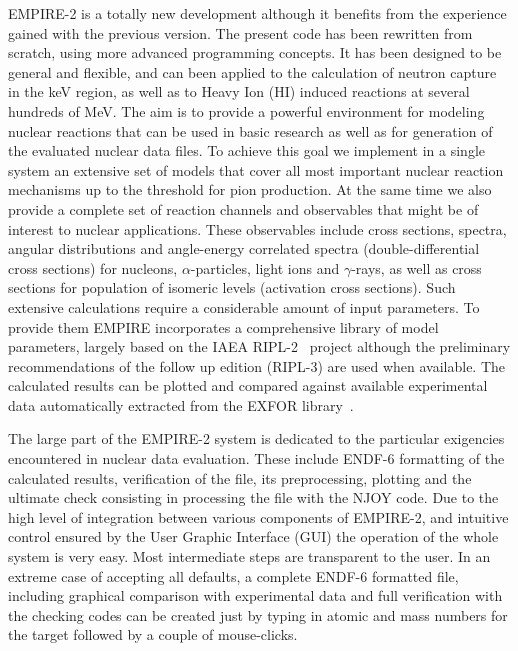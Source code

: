 \documentclass[twocolumn,amsmath,amssymb,10pt,groupedaddress,a4paper]{revtex4}
\begin{document}
EMPIRE-2 is a totally new development although it benefits from the experience
gained with the previous version. The present code
has been rewritten from scratch, using more advanced programming concepts.
It has been designed to be general and flexible, and can been applied
to the calculation of neutron capture in the keV region, as well as
to Heavy Ion (HI) induced reactions at several hundreds of MeV. The aim is to
provide a powerful environment for modeling nuclear reactions that can be used
in basic research as well as for generation of the evaluated nuclear data files.
To achieve this goal we implement in a single system an extensive set of
models that cover all most important nuclear reaction mechanisms up to the
threshold for pion production. At the same time we also provide a complete set of reaction channels and
observables that might be of interest to nuclear applications. These observables include
cross sections, spectra, angular distributions and angle-energy correlated spectra
(double-differential cross sections) for nucleons, $\alpha$-particles, light ions
and $\gamma$-rays, as well as cross sections for population of isomeric levels
(activation cross sections). Such extensive calculations require a considerable amount
of input parameters. To provide them EMPIRE incorporates a comprehensive library of model
parameters, largely based on the IAEA RIPL-2~\cite{RIPL-2} project
although the preliminary recommendations of the follow up edition (RIPL-3) are used when available. The calculated results
can be plotted and compared against available experimental data automatically extracted
from the EXFOR library~\cite{EXFOR}.

The large part of the EMPIRE-2 system is dedicated to the
particular exigencies encountered in nuclear data evaluation. These include ENDF-6 formatting
of the calculated results, verification of the file, its preprocessing, plotting and the ultimate check consisting in processing the file with the NJOY code. Due to the high level of
integration between various components of EMPIRE-2, and intuitive control ensured by the
User Graphic Interface (GUI) the operation of the whole system is very easy.  Most intermediate steps
are transparent to the user.  In an extreme case of accepting all defaults, a complete ENDF-6 formatted file, including graphical comparison with experimental data and full verification with the checking
codes can be created just by typing in atomic and mass numbers for the target followed by a couple of mouse-clicks.
\end{document}
